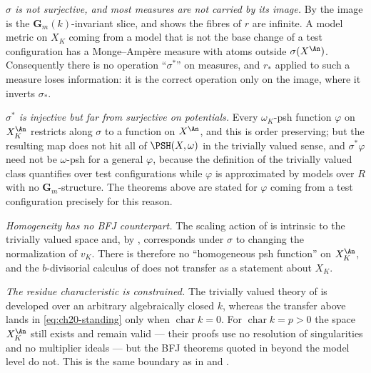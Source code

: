 \emph{\(\sigma\) is not surjective, and most measures are not carried by
its image.}  By  the image is the
\(\mathbf G_m(k)\)-invariant slice, and
 shows the fibres of \(r\) are infinite.
A model metric on \(X_K\) coming from a model that is not the base change
of a test configuration has a Monge--Amp\`ere measure with atoms outside
\(\sigma(X^{\An})\).  Consequently there is no operation
``\(\sigma^*\)'' on measures, and \(r_*\) applied to such a measure loses
information: it is the correct operation only on the image, where it
inverts \(\sigma_*\).

\emph{\(\sigma^*\) is injective but far from surjective on potentials.}
Every \(\omega_K\)-psh function \(\varphi\) on \(X_K^{\An}\) restricts along
\(\sigma\) to a function on \(X^{\An}\), and this is order preserving; but
the resulting map does not hit all of \(\PSH(X,\omega)\) in the trivially
valued sense, and \(\sigma^*\varphi\) need not be \(\omega\)-psh for a
general \(\varphi\), because the definition of the trivially valued class
quantifies over test configurations while \(\varphi\) is approximated by
models over \(R\) with no \(\mathbf G_m\)-structure.  The theorems above
are stated for \(\varphi\) coming from a test configuration precisely for
this reason.

\emph{Homogeneity has no BFJ counterpart.}  The scaling action of
 is intrinsic to the trivially valued
space and, by , corresponds under \(\sigma\)
to changing the normalization of \(v_K\).  There is therefore no
``homogeneous psh function'' on \(X_K^{\An}\), and the \(b\)-divisorial
calculus of  does not transfer as a
statement about \(X_K\).

\emph{The residue characteristic is constrained.}  The trivially valued
theory of  is developed over an arbitrary algebraically
closed \(k\), whereas the transfer above lands in
\eqref{eq:ch20-standing} only when \(\operatorname{char}k=0\).  For
\(\operatorname{char}k=p>0\) the space \(X_K^{\An}\) still exists and
 remain valid --- their proofs use no
resolution of singularities and no multiplier ideals --- but the BFJ
theorems quoted in  beyond the model level do
not.  This is the same boundary as in
 and
.

